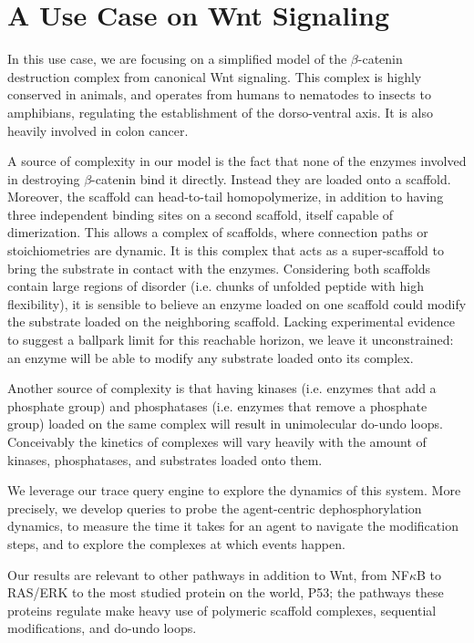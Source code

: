 \section{A Use Case on Wnt Signaling}\label{sec:use-case}

In this use case, we are focusing on a simplified model of the
$\beta$-catenin destruction complex from canonical Wnt signaling. This
complex is highly conserved in animals, and operates from humans to
nematodes to insects to amphibians, regulating the establishment of
the dorso-ventral axis. It is also heavily involved in colon cancer.

A source of complexity in our model is the fact that none of the
enzymes involved in destroying $\beta$-catenin bind it directly.
Instead they are loaded onto a scaffold. Moreover, the scaffold can
head-to-tail homopolymerize, in addition to having three independent
binding sites on a second scaffold, itself capable of dimerization.
This allows a complex of scaffolds, where connection
paths or stoichiometries are dynamic. It is this complex that acts as a
super-scaffold to bring the substrate in contact with the
enzymes. Considering both scaffolds contain large regions of disorder
(i.e. chunks of unfolded peptide with high flexibility), it is
sensible to believe an enzyme loaded on one scaffold could modify the
substrate loaded on the neighboring scaffold. Lacking experimental
evidence to suggest a ballpark limit for this reachable horizon, we
leave it unconstrained: an enzyme will be able to modify any substrate
loaded onto its complex.

Another source of complexity is that having kinases (i.e. enzymes that
add a phosphate group) and phosphatases (i.e. enzymes that remove a
phosphate group) loaded on the same complex will result in
unimolecular do-undo loops. Conceivably the kinetics of complexes will
vary heavily with the amount of kinases, phosphatases, and substrates
loaded onto them. %

\bigskip

We leverage our trace query engine to explore the dynamics of this
system. More precisely, we develop queries to probe the agent-centric
dephosphorylation dynamics, to measure the time it takes for an agent
to navigate the modification steps, and to explore the complexes at
which events happen.

Our results are relevant to other pathways in addition to Wnt, from
NF$\kappa$B to RAS/ERK to the most studied protein on the world, P53;
the pathways these proteins regulate make heavy use of polymeric
scaffold complexes, sequential modifications, and do-undo loops.




